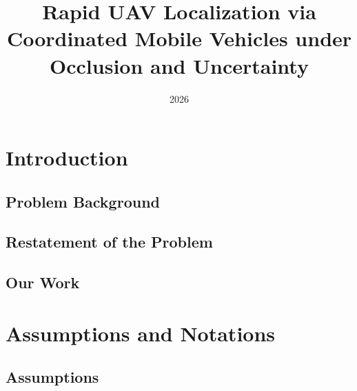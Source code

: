 \documentclass{swmcmthesis}
\title{Rapid UAV Localization via Coordinated Mobile Vehicles under Occlusion and Uncertainty} %
\date{2026}
\begin{document}
\maketitle

\tableofcontents
\newpage

\setcounter{page}{1}

\section{Introduction}
\subsection{Problem Background}
\subsection{Restatement of the Problem}
\subsection{Our Work}

\section{Assumptions and Notations}
\subsection{Assumptions}
\begin{assumption}
\end{assumption}
\end{document}
